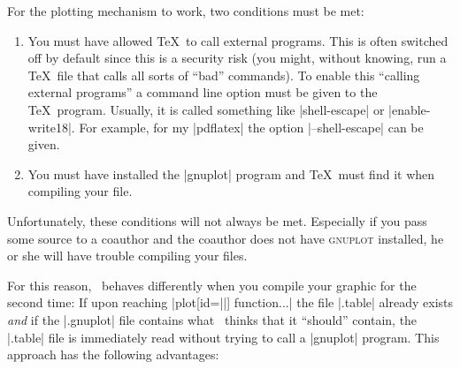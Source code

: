 For the plotting mechanism to work, two conditions must be met:
\begin{enumerate}
\item
  You must have allowed \TeX\ to call external programs. This is often
  switched off by default since this is a security risk (you might,
  without knowing, run a \TeX\ file that calls all sorts of ``bad''
  commands). To enable this ``calling external programs'' a command
  line option must be given to the \TeX\ program. Usually, it is
  called something like |shell-escape| or |enable-write18|. For
  example, for my |pdflatex| the option |--shell-escape| can be
  given.
\item
  You must have installed the |gnuplot| program and \TeX\ must find it
  when compiling your file.
\end{enumerate}

Unfortunately, these conditions will not always be met. Especially if
you pass some source to a coauthor and the coauthor does not have
\textsc{gnuplot} installed, he or she will have trouble compiling your
files.

For this reason, \tikzname\ behaves differently when you compile your
graphic for the second time: If upon reaching
|plot[id=||] function{...}| the file |.table|
already exists \emph{and} if the |.gnuplot| file
contains what \tikzname\ thinks that it ``should'' contain, the |.table|
file is immediately read without trying to call a |gnuplot|
program. This approach has the following advantages: 

